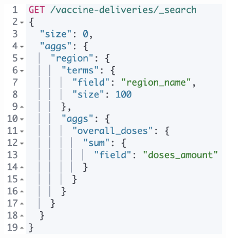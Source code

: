 \documentclass{article}[IEEEtran]
\begin{document}
\begin{figure}[H]
\begin{center}
\begin{minipage}[b]{0.4\textwidth}
    \includegraphics[width=\textwidth, frame]{Query_11.PNG}
    \subcaption{}
  \end{minipage}
  \hfill
  \begin{minipage}[b]{0.4\textwidth}

\end{minipage}
\end{center}
\end{figure}
\end{document}
